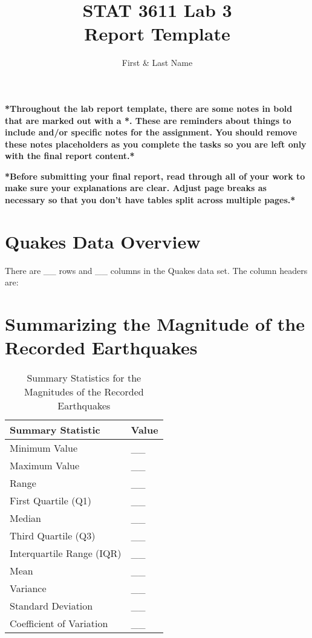 \documentclass[12pt]{article}
\begin{document}
\title{STAT 3611 Lab 3\\ Report Template}
\author{First \& Last Name}
\date{}
\maketitle

\textbf{*Throughout the lab report template, there are some notes in bold that are marked out with a *. These are reminders about things to include and/or specific notes for the assignment. You should remove these notes placeholders as you complete the tasks so you are left only with the final report content.*}

\textbf{*Before submitting your final report, read through all of your work to make sure your explanations are clear. Adjust page breaks as necessary so that you don’t have tables split across multiple pages.*}

\section*{Quakes Data Overview}
There are \_\_ rows and \_\_ columns in the Quakes data set. The column headers are: 

\section*{Summarizing the Magnitude of the Recorded Earthquakes}

\begin{table}[h]
    \centering
    \begin{tabular}{l l}
        \toprule
        \textbf{Summary Statistic} & \textbf{Value} \\
        \midrule
        Minimum Value & \_\_ \\
        Maximum Value & \_\_ \\
        Range & \_\_ \\
        First Quartile (Q1) & \_\_ \\
        Median & \_\_ \\
        Third Quartile (Q3) & \_\_ \\
        Interquartile Range (IQR) & \_\_ \\
        Mean & \_\_ \\
        Variance & \_\_ \\
        Standard Deviation & \_\_ \\
        Coefficient of Variation & \_\_ \\
        \bottomrule
    \end{tabular}
    \caption{Summary Statistics for the Magnitudes of the Recorded Earthquakes}
\end{table}
\end{document}
